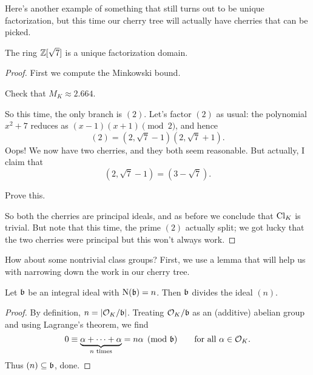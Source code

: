 Here's another example of something that still turns out to be unique factorization,
but this time our cherry tree will actually have cherries that can be picked.
\begin{proposition}
	The ring $\mathbb Z[\sqrt 7]$ is a unique factorization domain.
\end{proposition}
\begin{proof}
	First we compute the Minkowski bound.
	\begin{ques}
		Check that $M_K \approx 2.664$.
	\end{ques}
	So this time, the only branch is $(2)$. Let's factor $(2)$ as usual: the polynomial $x^2+7$
	reduces as $(x-1)(x+1) \pmod 2$, and hence
	\[ (2) = \left( 2, \sqrt7-1 \right) \left( 2, \sqrt7+1 \right). \]
	Oops! We now have two cherries, and they both seem reasonable.
	But actually, I claim that
	\[ \left( 2, \sqrt7-1 \right) = \left( 3 - \sqrt 7 \right). \]
	\begin{ques}
		Prove this.
	\end{ques}
	So both the cherries are principal ideals, and as before we conclude that $\mathrm{Cl}_K$ is trivial.
	But note that this time, the prime $(2)$ actually split; we got lucky
	that the two cherries were principal but this won't always work.
\end{proof}

How about some nontrivial class groups?
First, we use a lemma that will help us with
narrowing down the work in our cherry tree.
\begin{lemma}
	Let $\mathfrak b$ be an integral ideal with $\operatorname{N}(\mathfrak b) = n$.
	Then $\mathfrak b$ divides the ideal $(n)$.
\end{lemma}
\begin{proof}
	By definition, $n = \left\lvert \mathcal O_K / \mathfrak b \right\rvert$.
	Treating $\mathcal O_K/\mathfrak b$ as an (additive) abelian group and using Lagrange's theorem, we find
	\[ 0 \equiv
		\underbrace{\alpha + \dots + \alpha}_{n\text{ times}} = n\alpha
		\pmod {\mathfrak b} \qquad\text{for all } \alpha \in \mathcal O_K. \]
	Thus $(n) \subseteq \mathfrak b$, done.
\end{proof}

